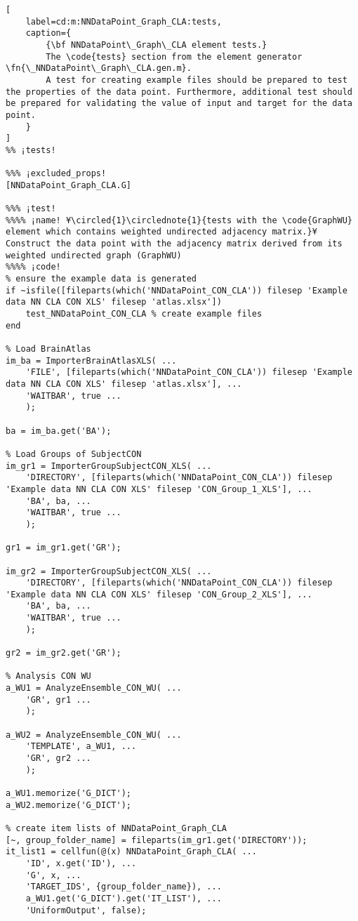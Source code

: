 \documentclass{tufte-handout}
\begin{document}
\begin{lstlisting}[
	label=cd:m:NNDataPoint_Graph_CLA:tests,
	caption={
		{\bf NNDataPoint\_Graph\_CLA element tests.}
		The \code{tests} section from the element generator \fn{\_NNDataPoint\_Graph\_CLA.gen.m}.
		A test for creating example files should be prepared to test the properties of the data point. Furthermore, additional test should be prepared for validating the value of input and target for the data point.
	}
]		
%% ¡tests!

%%% ¡excluded_props!
[NNDataPoint_Graph_CLA.G]

%%% ¡test!
%%%% ¡name! ¥\circled{1}\circlednote{1}{tests with the \code{GraphWU} element which contains weighted undirected adjacency matrix.}¥
Construct the data point with the adjacency matrix derived from its weighted undirected graph (GraphWU) 
%%%% ¡code!
% ensure the example data is generated
if ~isfile([fileparts(which('NNDataPoint_CON_CLA')) filesep 'Example data NN CLA CON XLS' filesep 'atlas.xlsx'])
    test_NNDataPoint_CON_CLA % create example files
end

% Load BrainAtlas
im_ba = ImporterBrainAtlasXLS( ...
    'FILE', [fileparts(which('NNDataPoint_CON_CLA')) filesep 'Example data NN CLA CON XLS' filesep 'atlas.xlsx'], ...
    'WAITBAR', true ...
    );

ba = im_ba.get('BA');

% Load Groups of SubjectCON
im_gr1 = ImporterGroupSubjectCON_XLS( ...
    'DIRECTORY', [fileparts(which('NNDataPoint_CON_CLA')) filesep 'Example data NN CLA CON XLS' filesep 'CON_Group_1_XLS'], ...
    'BA', ba, ...
    'WAITBAR', true ...
    );

gr1 = im_gr1.get('GR');

im_gr2 = ImporterGroupSubjectCON_XLS( ...
    'DIRECTORY', [fileparts(which('NNDataPoint_CON_CLA')) filesep 'Example data NN CLA CON XLS' filesep 'CON_Group_2_XLS'], ...
    'BA', ba, ...
    'WAITBAR', true ...
    );

gr2 = im_gr2.get('GR');

% Analysis CON WU
a_WU1 = AnalyzeEnsemble_CON_WU( ...
    'GR', gr1 ...
    );

a_WU2 = AnalyzeEnsemble_CON_WU( ...
    'TEMPLATE', a_WU1, ...
    'GR', gr2 ...
    );

a_WU1.memorize('G_DICT');
a_WU2.memorize('G_DICT');

% create item lists of NNDataPoint_Graph_CLA
[~, group_folder_name] = fileparts(im_gr1.get('DIRECTORY'));
it_list1 = cellfun(@(x) NNDataPoint_Graph_CLA( ...
    'ID', x.get('ID'), ...
    'G', x, ...
    'TARGET_IDS', {group_folder_name}), ...
    a_WU1.get('G_DICT').get('IT_LIST'), ...
    'UniformOutput', false);


\end{lstlisting}
\end{document}
